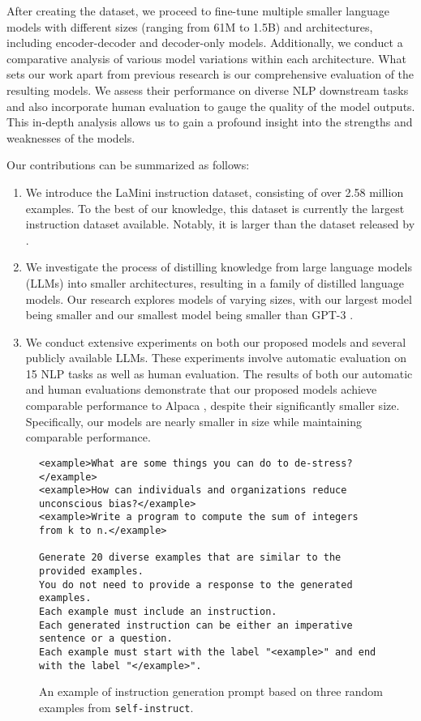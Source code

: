 \documentclass[11pt]{article}
\newcommand{\dataset}[1]{\texttt{#1}\xspace}
\newcommand{\modelname}{LaMini\xspace}
\begin{document}
After creating the dataset, we proceed to fine-tune multiple smaller language models with different sizes (ranging from 61M to 1.5B) and architectures, including encoder-decoder and decoder-only models. Additionally, we conduct a comparative analysis of various model variations within each architecture. 
What sets our work apart from previous research is our comprehensive evaluation of the resulting models. We assess their performance on diverse NLP downstream tasks and also incorporate human evaluation to gauge the quality of the model outputs. This in-depth analysis allows us to gain a profound insight into the strengths and weaknesses of the models.



Our contributions can be summarized as follows:
\begin{enumerate}
    \item We introduce the \modelname instruction dataset, consisting of over 2.58 million examples. To the best of our knowledge, this dataset is currently the largest instruction dataset available. Notably, it is  larger than the dataset released by \citet{alpaca}.
    \item We investigate the process of distilling knowledge from large language models (LLMs) into smaller architectures, resulting in a family of distilled language models. Our research explores models of varying sizes, with our largest model being  smaller and our smallest model being  smaller than GPT-3 \cite{NEURIPS2020_1457c0d6}.
    \item We conduct extensive experiments on both our proposed models and several publicly available LLMs. These experiments involve automatic evaluation on 15 NLP tasks as well as human evaluation. The results of both our automatic and human evaluations demonstrate that our proposed models achieve comparable performance to Alpaca \cite{alpaca}, despite their significantly smaller size. Specifically, our models are nearly  smaller in size while maintaining comparable performance.
\end{enumerate}

\begin{figure*}[t]
    \centering
    \footnotesize
    \begin{Verbatim}[frame=single]
<example>What are some things you can do to de-stress?</example>
<example>How can individuals and organizations reduce unconscious bias?</example>
<example>Write a program to compute the sum of integers from k to n.</example>

Generate 20 diverse examples that are similar to the provided examples.
You do not need to provide a response to the generated examples.
Each example must include an instruction.
Each generated instruction can be either an imperative sentence or a question.
Each example must start with the label "<example>" and end with the label "</example>".
    \end{Verbatim}
    \caption{An example of instruction generation prompt based on three random examples from \dataset{self-instruct}.}
    \label{fig:prompt_example}

\end{figure*}
\end{document}
